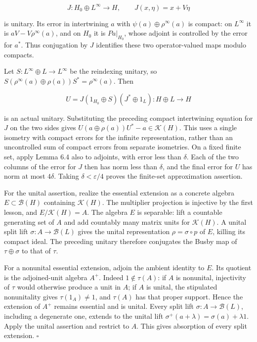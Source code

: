 \documentclass[
  11pt,
]{article}
\begin{document}
\[
J:H_0\oplus L^\infty\longrightarrow H,\qquad
J(x,\eta)=x+V\eta
\]

is unitary. Its error in intertwining \(a\) with
\(\psi(a)\oplus\rho^\infty(a)\) is compact: on \(L^\infty\) it is
\(aV-V\rho^\infty(a)\), and on \(H_0\) it is \(Pa|_{H_0}\), whose
adjoint is controlled by the error for \(a^*\). Thus conjugation by
\(J\) identifies these two operator-valued maps modulo compacts.

Let \(S:L^\infty\oplus L\to L^\infty\) be the reindexing unitary, so
\(S(\rho^\infty(a)\oplus\rho(a))S^*=\rho^\infty(a)\). Then

\[
U=J(1_{H_0}\oplus S)(J^*\oplus1_L):H\oplus L\longrightarrow H
\]

is an actual unitary. Substituting the preceding compact intertwining
equation for \(J\) on the two sides gives
\(U(a\oplus\rho(a))U^*-a\in\mathcal K(H)\). This uses a single isometry
with compact errors for the infinite representation, rather than an
uncontrolled sum of compact errors from separate isometries. On a fixed
finite set, apply Lemma 6.4 also to adjoints, with error less than
\(\delta\). Each of the two columns of the error for \(J\) then has norm
less than \(\delta\), and the final error for \(U\) has norm at most
\(4\delta\). Taking \(\delta<\varepsilon/4\) proves the finite-set
approximation assertion.

For the unital assertion, realize the essential extension as a concrete
algebra \(E\subset\mathcal B(H)\) containing \(\mathcal K(H)\). The
multiplier projection is injective by the first lesson, and
\(E/\mathcal K(H)=A\). The algebra \(E\) is separable: lift a countable
generating set of \(A\) and add countably many matrix units for
\(\mathcal K(H)\). A unital split lift \(\sigma:A\to\mathcal B(L)\)
gives the unital representation \(\rho=\sigma\circ p\) of \(E\), killing
its compact ideal. The preceding unitary therefore conjugates the Busby
map of \(\tau\oplus\sigma\) to that of \(\tau\).

For a nonunital essential extension, adjoin the ambient identity to
\(E\). Its quotient is the adjoined-unit algebra \(A^+\). Indeed
\(1\notin\tau(A)\): if \(A\) is nonunital, injectivity of \(\tau\) would
otherwise produce a unit in \(A\); if \(A\) is unital, the stipulated
nonunitality gives \(\tau(1_A)\ne1\), and \(\tau(A)\) has that proper
support. Hence the extension of \(A^+\) remains essential and is unital.
Every split lift \(\sigma:A\to\mathcal B(L)\), including a degenerate
one, extends to the unital lift
\(\sigma^+(a+\lambda)=\sigma(a)+\lambda1\). Apply the unital assertion
and restrict to \(A\). This gives absorption of every split extension.
\(\square\)
\end{document}
